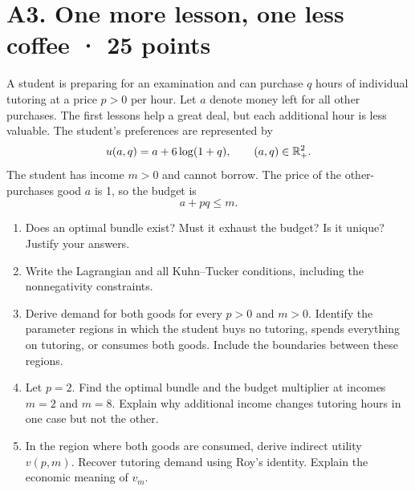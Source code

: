 \section*{A3. One more lesson, one less coffee · 25 points}
A student is preparing for an examination and can purchase $q$ hours of individual tutoring at a price $p>0$ per hour. Let $a$ denote money left for all other purchases. The first lessons help a great deal, but each additional hour is less valuable. The student's preferences are represented by
\[
 u(a,q)=a+6\log(1+q),\qquad (a,q)\in\mathbb R_+^2.
\]
The student has income $m>0$ and cannot borrow. The price of the other-purchases good $a$ is 1, so the budget is
\[
 a+pq\le m.
\]
\begin{enumerate}[label=(\alph*)]
\item Does an optimal bundle exist? Must it exhaust the budget? Is it unique? Justify your answers.
\item Write the Lagrangian and all Kuhn--Tucker conditions, including the nonnegativity constraints.
\item Derive demand for both goods for every $p>0$ and $m>0$. Identify the parameter regions in which the student buys no tutoring, spends everything on tutoring, or consumes both goods. Include the boundaries between these regions.
\item Let $p=2$. Find the optimal bundle and the budget multiplier at incomes $m=2$ and $m=8$. Explain why additional income changes tutoring hours in one case but not the other.
\item In the region where both goods are consumed, derive indirect utility $v(p,m)$. Recover tutoring demand using Roy's identity. Explain the economic meaning of $v_m$.
\end{enumerate}
